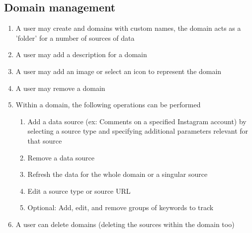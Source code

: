 \documentclass[12pt]{article}
\begin{document}
\subsection{Domain management}
\begin{enumerate}
  \item A user may create and domains with custom names, the domain acts as a 'folder' for a number of sources of data
  \item A user may add a description for a domain
  \item A user may add an image or select an icon to represent the domain
  \item A user may remove a domain
  \item Within a domain, the following operations can be performed
        \begin{enumerate}
          \item Add a data source (ex: Comments on a specified Instagram account) by selecting a source type and specifying additional parameters relevant for that source
          \item Remove a data source
          \item Refresh the data for the whole domain or a singular source
          \item Edit a source type or source URL
          \item Optional: Add, edit, and remove groups of keywords to track
        \end{enumerate}
  \item A user can delete domains (deleting the sources within the domain too)
\end{enumerate}
\end{document}
